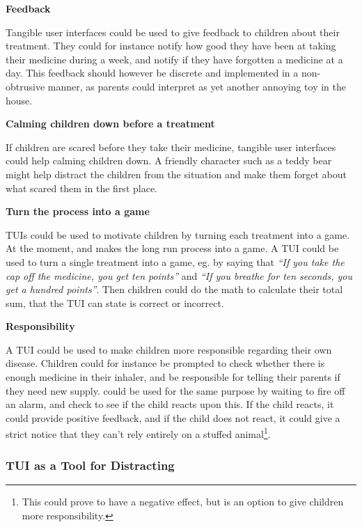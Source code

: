 \textbf{Feedback}

Tangible user interfaces could be used to give feedback to children about their treatment. They could for instance notify how good they have been at taking their medicine during a week, and notify if they have forgotten a medicine at a day. This feedback should however be discrete and implemented in a non-obtrusive manner, as parents could interpret \ab{} as yet another annoying toy in the house.   


\textbf{Calming children down before a treatment}

If children are scared before they take their medicine, tangible user interfaces could help calming children down. A friendly character such as a teddy bear might help distract the children from the situation and make them forget about what scared them in the first place. 


\textbf{Turn the process into a game}

TUIs could be used to motivate children by turning each treatment into a game. At the moment, \ab{} and \app{} makes the long run process into a game. A TUI could be used to turn a single treatment into a game, eg. by saying that \textit{``If you take the cap off the medicine, you get ten points''} and \textit{``If you breathe for ten seconds, you get a hundred points''}. Then children could do the math to calculate their total sum, that the TUI can state is correct or incorrect. 


\textbf{Responsibility}

A TUI could be used to make children more responsible regarding their own disease. Children could for instance be prompted to check whether there is enough medicine in their inhaler, and be responsible for telling their parents if they need new supply. \ab{} could be used for the same purpose by waiting to fire off an alarm, and check to see if the child reacts upon this. If the child reacts, it could provide positive feedback, and if the child does not react, it could give a strict notice that they can't rely entirely on a stuffed animal\footnote{This could prove to have a negative effect, but is an option to give children more responsibility.}.  

\subsubsection{TUI as a Tool for Distracting}
\label{sec:tuiasatoolfordistracting}

